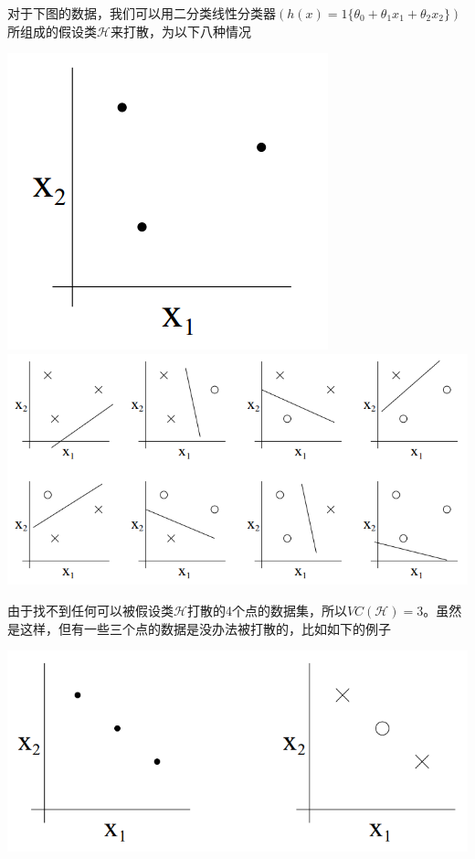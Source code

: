 对于下图的数据，我们可以用二分类线性分类器$(h(x)=1\{\theta_0+\theta_1 x_1+\theta_2 x_2\})$所组成的假设类$\mathcal{H}$来打散，为以下八种情况
\begin{center}
\includegraphics[scale=0.8]{../figures/LT2.PNG} \\
\includegraphics[scale=1]{../figures/LT3.PNG}
\end{center}
由于找不到任何可以被假设类$\mathcal{H}$打散的4个点的数据集，所以$VC(\mathcal{H})=3$。虽然是这样，但有一些三个点的数据是没办法被打散的，比如如下的例子
\begin{center}
\includegraphics[scale=0.8]{../figures/LT4.PNG}
\end{center}


